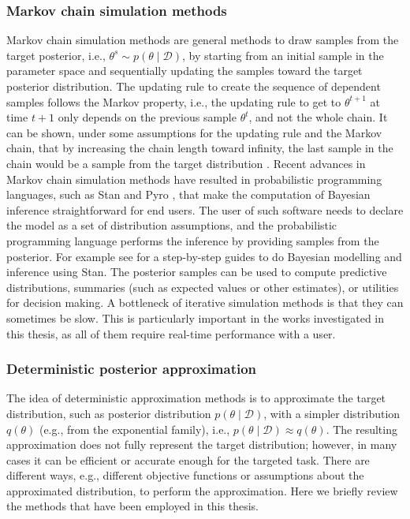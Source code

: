 \documentclass[dissertation,math,vertlayout,pdfa,colorlinks]{aaltoseries}
\newcommand{\bD}{\mathcal{D}}
\begin{document}
\subsubsection{Markov chain simulation methods}

Markov chain simulation methods are general methods to draw samples from the target posterior, i.e., $\theta^s \sim p(\theta \mid \bD)$, by starting from an initial sample in the parameter space and sequentially updating the samples toward the target posterior distribution. The updating rule to create the sequence of dependent samples follows the Markov property, i.e., the updating rule to get to $\theta^{t+1}$ at time $t+1$ only depends on the previous sample $\theta^t$, and not the whole chain. %
It can be shown, under some assumptions for the updating rule and the Markov chain, that by increasing the chain length toward infinity, the last sample in the chain would be a sample from the target distribution \cite[Chapter~11]{Gelman2013}. Recent advances in Markov chain simulation methods have resulted in probabilistic programming languages, such as Stan \cite{STAN} and Pyro \cite{bingham2018pyro}, that make the computation of Bayesian inference straightforward for end users. The user of such software needs to declare the model as a set of distribution assumptions, and the probabilistic programming language performs the inference by providing samples from the posterior. For example see \cite{Bayesian_workflow_cog_sci_2019} for a step-by-step guides to do Bayesian modelling and inference using Stan. The posterior samples can be used to compute predictive distributions, summaries (such as expected values or other estimates), or utilities for decision making. A bottleneck of iterative simulation methods is that they can sometimes be slow. This is particularly important in the works investigated in this thesis, as all of them require real-time performance with a user.

\subsubsection{Deterministic posterior approximation}

The idea of deterministic approximation methods is to approximate the target distribution, such as posterior distribution $p(\theta \mid \bD)$, with a simpler distribution $q(\theta)$ (e.g., from the exponential family), i.e., $p(\theta \mid \bD) \approx q(\theta)$. The resulting approximation does not fully represent the target distribution; however, in many cases it can be efficient or accurate enough for the targeted task. There are different ways, e.g., different objective functions or assumptions about the approximated distribution, to perform the approximation. Here we briefly review the methods that have been employed in this thesis. 
\end{document}
